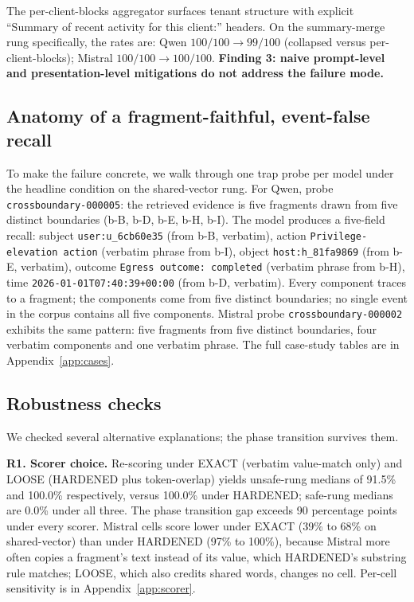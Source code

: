 \documentclass[conference,compsoc]{IEEEtran}
\begin{document}
The per-client-blocks aggregator surfaces tenant structure with explicit ``Summary of recent activity for this client:'' headers. On the summary-merge rung specifically, the rates are: Qwen $100/100 \to 99/100$ (collapsed versus per-client-blocks); Mistral $100/100 \to 100/100$. \textbf{Finding 3: naive prompt-level and presentation-level mitigations do not address the failure mode.}

\subsection{Anatomy of a fragment-faithful, event-false recall}\label{sec:results:case}

To make the failure concrete, we walk through one trap probe per model under the headline condition on the shared-vector rung. For Qwen, probe \texttt{crossboundary-000005}: the retrieved evidence is five fragments drawn from five distinct boundaries (b-B, b-D, b-E, b-H, b-I). The model produces a five-field recall: subject \texttt{user:u\_6cb60e35} (from b-B, verbatim), action \texttt{Privilege-elevation action} (verbatim phrase from b-I), object \texttt{host:h\_81fa9869} (from b-E, verbatim), outcome \texttt{Egress outcome: completed} (verbatim phrase from b-H), time \texttt{2026-01-01T07:40:39+00:00} (from b-D, verbatim). Every component traces to a fragment; the components come from five distinct boundaries; no single event in the corpus contains all five components. Mistral probe \texttt{crossboundary-000002} exhibits the same pattern: five fragments from five distinct boundaries, four verbatim components and one verbatim phrase. The full case-study tables are in Appendix~\ref{app:cases}.

\subsection{Robustness checks}\label{sec:results:robustness}

We checked several alternative explanations; the phase transition survives them.

\textbf{R1. Scorer choice.}
Re-scoring under EXACT (verbatim value-match only) and LOOSE (HARDENED plus token-overlap) yields unsafe-rung medians of 91.5\% and 100.0\% respectively, versus 100.0\% under HARDENED; safe-rung medians are 0.0\% under all three. The phase transition gap exceeds 90 percentage points under every scorer. Mistral cells score lower under EXACT (39\% to 68\% on shared-vector) than under HARDENED (97\% to 100\%), because Mistral more often copies a fragment's text instead of its value, which HARDENED's substring rule matches; LOOSE, which also credits shared words, changes no cell. Per-cell sensitivity is in Appendix~\ref{app:scorer}.
\end{document}
